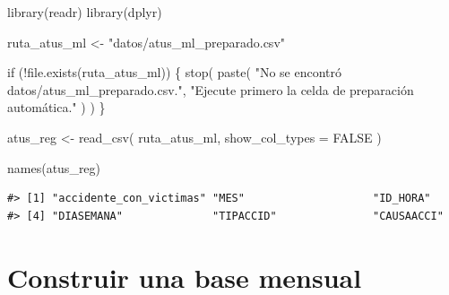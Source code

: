 \documentclass[
  spanish,
  10.5pt,
  letterpaper,
  openany,
  headings=big]{scrbook}
\newenvironment{Shaded}{}{}
\newcommand{\AttributeTok}[1]{\textcolor[rgb]{0.84,0.23,0.29}{#1}}
\newcommand{\ConstantTok}[1]{\textcolor[rgb]{0.00,0.36,0.77}{#1}}
\newcommand{\ControlFlowTok}[1]{\textcolor[rgb]{0.84,0.23,0.29}{#1}}
\newcommand{\FunctionTok}[1]{\textcolor[rgb]{0.44,0.26,0.76}{#1}}
\newcommand{\NormalTok}[1]{\textcolor[rgb]{0.14,0.16,0.18}{#1}}
\newcommand{\OtherTok}[1]{\textcolor[rgb]{0.44,0.26,0.76}{#1}}
\newcommand{\SpecialCharTok}[1]{\textcolor[rgb]{0.00,0.36,0.77}{#1}}
\newcommand{\StringTok}[1]{\textcolor[rgb]{0.01,0.18,0.38}{#1}}
\begin{document}
\begin{Shaded}
\begin{Highlighting}[]
\FunctionTok{library}\NormalTok{(readr)}
\FunctionTok{library}\NormalTok{(dplyr)}

\NormalTok{ruta\_atus\_ml }\OtherTok{\textless{}{-}} \StringTok{"datos/atus\_ml\_preparado.csv"}

\ControlFlowTok{if}\NormalTok{ (}\SpecialCharTok{!}\FunctionTok{file.exists}\NormalTok{(ruta\_atus\_ml)) \{}
  \FunctionTok{stop}\NormalTok{(}
    \FunctionTok{paste}\NormalTok{(}
      \StringTok{"No se encontró datos/atus\_ml\_preparado.csv."}\NormalTok{,}
      \StringTok{"Ejecute primero la celda de preparación automática."}
\NormalTok{    )}
\NormalTok{  )}
\NormalTok{\}}

\NormalTok{atus\_reg }\OtherTok{\textless{}{-}} \FunctionTok{read\_csv}\NormalTok{(}
\NormalTok{  ruta\_atus\_ml,}
  \AttributeTok{show\_col\_types =} \ConstantTok{FALSE}
\NormalTok{)}

\FunctionTok{names}\NormalTok{(atus\_reg)}
\end{Highlighting}
\end{Shaded}

\begin{verbatim}
#> [1] "accidente_con_victimas" "MES"                    "ID_HORA"               
#> [4] "DIASEMANA"              "TIPACCID"               "CAUSAACCI"
\end{verbatim}

\section{Construir una base mensual}\label{construir-una-base-mensual}
\end{document}
